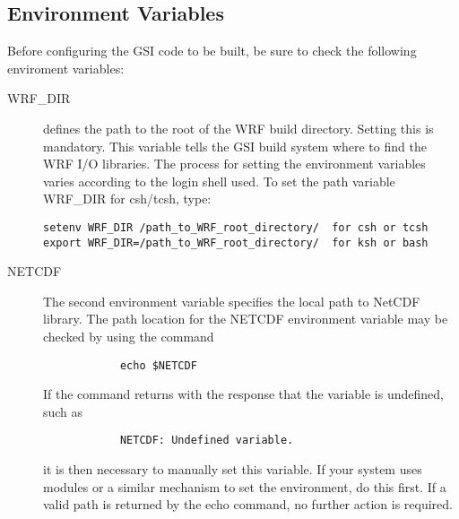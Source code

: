 \subsection{Environment Variables} \label{ch2_compiling_env}

Before configuring the GSI code to be built, be sure to check the following enviroment variables:

\begin{description}
\item[WRF\_DIR] defines the path to the root of the WRF build directory. Setting this is mandatory. This variable tells the GSI build system where to find the WRF I/O libraries. The process for setting the environment variables varies according to the login shell used. To set the path variable WRF\_DIR for csh/tcsh, type:
\begin{verbatim}
setenv WRF_DIR /path_to_WRF_root_directory/  for csh or tcsh
export WRF_DIR=/path_to_WRF_root_directory/  for ksh or bash
\end{verbatim}
\item[NETCDF] The second environment variable specifies the local path to NetCDF library. The path location for the NETCDF environment variable may be checked by using the command 
\begin{verbatim}
            echo $NETCDF
\end{verbatim}
If the command returns with the response that the variable is undefined, such as
\begin{verbatim}
            NETCDF: Undefined variable.
\end{verbatim}
it is then necessary to manually set this variable. If your system uses modules or a similar mechanism to set the environment, do this first. If a valid path is returned by the echo command, no further action is required.\\


\end{description}
